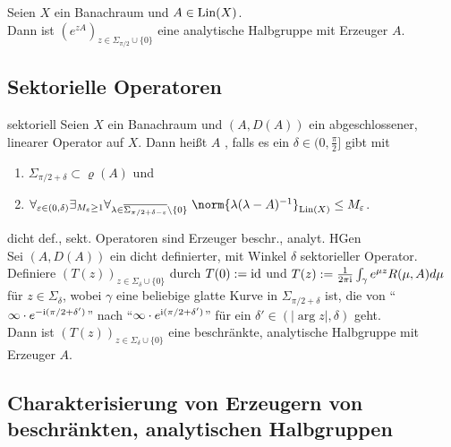\begin{Bsp}
    Seien $X$ ein Banachraum und $A \in \operatorname{Lin}(X)$.\\
    Dann ist $(e^{zA})_{z \in \Sigma_{\pi/2} \cup \{0\}}$ eine analytische Halbgruppe
    mit Erzeuger $A$.
\end{Bsp}

\subsection{%
    Sektorielle Operatoren%
}

\begin{Def}{sektoriell}
    Seien $X$ ein Banachraum und $(A, D(A))$ ein abgeschlossener, linearer Operator auf $X$.
    Dann heißt $A$ , falls
    es ein $\delta \in (0, \frac{\pi}{2}]$ gibt mit
    \begin{enumerate}
        \item
        $\Sigma_{\pi/2+\delta} \subset \varrho(A)$ und

        \item
        $\forall_{\varepsilon \in (0, \delta)} \exists_{M_\varepsilon \ge 1}
        \forall_{\lambda \in \overline{\Sigma_{\pi/2+\delta-\varepsilon}} \setminus \{0\}}\;
        \norm{\lambda (\lambda - A)^{-1}}_{\Lin(X)} \le M_\varepsilon$.
    \end{enumerate}
\end{Def}

\begin{Satz}{dicht def., sekt. Operatoren sind Erzeuger beschr., analyt. HGen}\\
    Sei $(A, D(A))$ ein dicht definierter, mit Winkel $\delta$ sektorieller Operator.\\
    Definiere $(T(z))_{z \in \Sigma_\delta \cup \{0\}}$ durch $T(0) := \text{id}$ und
    $T(z) := \frac{1}{2\pi\mathrm{i}} \int_\gamma e^{\mu z} R(\mu, A) d\mu$ für $z \in \Sigma_\delta$,
    wobei $\gamma$ eine beliebige glatte Kurve in $\Sigma_{\pi/2+\delta}$ ist,
    die von "`$\infty \cdot e^{-\mathrm{i}(\pi/2+\delta')}$"' nach
    "`$\infty \cdot e^{\mathrm{i}(\pi/2+\delta')}$"' für ein $\delta' \in (|\arg z|, \delta)$ geht.\\
    Dann ist $(T(z))_{z \in \Sigma_\delta \cup \{0\}}$ eine beschränkte, analytische Halbgruppe
    mit Erzeuger $A$.
\end{Satz}

\pagebreak

\subsection{%
    Charakterisierung von Erzeugern von beschränkten, analytischen Halbgruppen%
}

